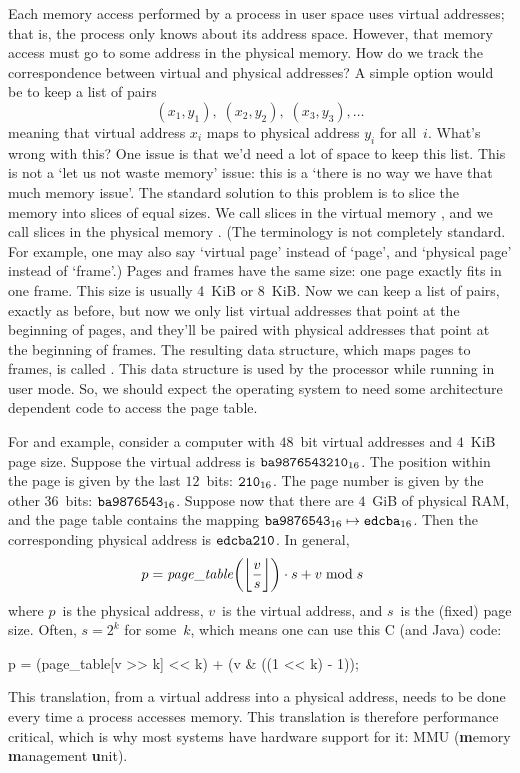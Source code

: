 
Each memory access performed by a process in user space uses virtual addresses;
  that is, the process only knows about its address space.
However, that memory access must go to some address in the physical memory.
How do we track the correspondence between virtual and physical addresses?
A simple option would be to keep a list of pairs
\[
  (x_1,y_1),\; (x_2,y_2),\; (x_3,y_3), \ldots
\]
meaning that virtual address $x_i$ maps to physical address $y_i$ for all~$i$.
What's wrong with this?
One issue is that we'd need a lot of space to keep this list.
This is not a `let us not waste memory' issue:
  this is a `there is no way we have that much memory issue'.
The standard solution to this problem
  is to slice the memory into slices of equal sizes.
We call slices in the virtual memory ,
  and we call slices in the physical memory .
(The terminology is not completely standard.
  For example, one may also say `virtual page' instead of `page',
    and `physical page' instead of `frame'.)
Pages and frames have the same size: one page exactly fits in one frame.
This size is usually 4~KiB or 8~KiB\null.
Now we can keep a list of pairs, exactly as before,
  but now we only list virtual addresses that point at the beginning of pages,
  and they'll be paired with physical addresses that point at the beginning of frames.
The resulting data structure, which maps pages to frames,
  is called .
This data structure is used by the processor while running in user mode.
So, we should expect the operating system to need some architecture dependent
  code to access the page table.

\smallskip

For and example,
  consider a computer with $48$~bit virtual addresses and $4$~KiB page size.
Suppose the virtual address is ${\tt ba9876543210}_{16}$.
The position within the page is given by the last $12$~bits:
  ${\tt210}_{16}$.
The page number is given by the other $36$~bits:
  ${\tt ba9876543}_{16}$.
Suppose now that there are $4$~GiB of physical RAM,
  and the page table contains the mapping
  ${\tt ba9876543}_{16} \mapsto {\tt edcba}_{16}$.
Then the corresponding physical address is
  ${\tt edcba210}$.
In general,
\begin{align}
p &= {\it page\_table}\biggl(\biggl\lfloor\frac{v}{s}\biggr\rfloor\biggr) \cdot s
  + v \bmod s
  \label{eq:translation}
\end{align}
where $p$~is the physical address,
  $v$~is the virtual address,
  and $s$~is the (fixed) page size.
Often, $s=2^k$ for some~$k$, which means one can use this C (and Java) code:
\begin{ccode}
  p = (page_table[v >> k] << k) + (v & ((1 << k) - 1));
\end{ccode}
This translation, from a virtual address into a physical address,
  needs to be done every time a process accesses memory.
This translation is therefore performance critical,
  which is why most systems have hardware support for it:
  MMU ({\bf m}emory {\bf m}anagement {\bf u}nit).

